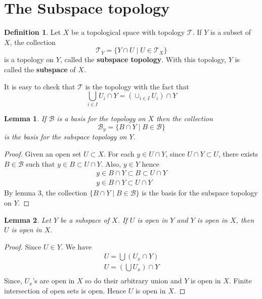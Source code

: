 \documentclass[12pt,reqno]{amsart}
\theoremstyle{plain}
\newtheorem{lem}{Lemma}
\theoremstyle{definition}
\newtheorem{defn}{Definition}
\newcommand{\cal}[1]{\mathcal{#1}}
\begin{document}
\section{The Subspace topology}
\begin{defn}
    Let $X$ be a topological space with topology $\cal T$. If $Y$ is a subset of $X$, the collection
    $$ \cal T_Y = \{Y \cap U \mid U \in \cal T_X\} $$
    is a topology on $Y$, called the {\bf subspace topology}. With this topology, $Y$ is called the {\bf subspace} of $X$.
\end{defn}
It is easy to check that $\cal T$ is the topology with the fact that 
$$ \bigcup_{i \in I} U_i \cap Y = (\cup_{i \in I} U_i) \cap Y$$

\begin{lem}
    If $\cal B$ is a basis for the topology on $X$ then the collection 
    $$ \cal B_y = \{ B \cap Y \mid B \in \cal B\}$$
    is the basis for the subspace topology on $Y$.    
\end{lem}
\begin{proof}
    Given an open set $U \subset X$. For each $y \in U \cap Y$, since $U \cap Y \subset U$, there exists $B \in \cal B$ such that $y \in B \subset U \cap Y$. Also, $y \in Y$ hence
    $$
    \begin{array}{l}
        y \in B \cap Y \subset B \subset U \cap Y \\
        y \in B \cap Y \subset U \cap Y        
    \end{array} 
    $$
    By lemma $3$, the collection $\{B \cap Y \mid B \in \cal B\}$ is the basis for the subspace topology on $Y$.
\end{proof}
\begin{lem}
    Let $Y$ be a subspace of $X$. If $U$ is open in $Y$ and $Y$ is open in $X$, then $U$ is open in $X$.
\end{lem}
\begin{proof}
    Since $U \in Y$. We have 
    $$
    \begin{array}{l}
        U = \bigcup (U_x \cap Y) \\
        U = (\bigcup U_x) \cap Y \\        
    \end{array}
    $$
    Since, $U_x$'s are open in $X$ so do their arbitrary union and $Y$ is open in $X$. Finite intersection of open sets is open. Hence $U$ is open in $X$.
\end{proof}
\end{document}
